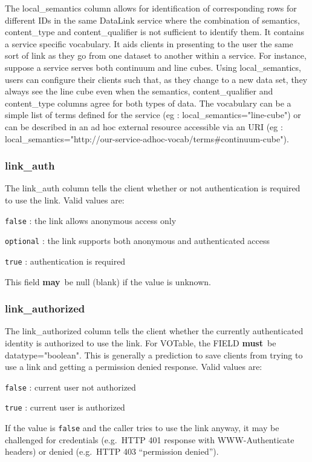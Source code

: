 \documentclass[11pt,a4paper]{ivoa}
\newcommand{\attval}[2]{#1={\allowbreak}{"}#2{"}}
\newcommand{\rfcmust}{\textbf{must}}
\newcommand{\rfcmay}{\textbf{may}}
\begin{document}
The local\_semantics column allows for identification of corresponding rows for
different IDs in the same DataLink service where the combination of semantics,
content\_type and content\_qualifier is not sufficient to identify them.
It contains a service specific vocabulary. It aids clients in presenting to the
user the same sort of link as they go from one dataset to another within a service.
For instance, suppose a service serves both continuum and line cubes. 
Using local\_semantics, users can configure their clients such that, as they change
to a new data set, they always see the line cube even when the semantics, 
content\_qualifier and content\_type columns agree for both types of data. 
The vocabulary can be a simple list of terms defined for the service
(eg : local\_semantics="line-cube") or can be described in an ad hoc external resource
accessible via an URI 
(eg : local\_semantics="http://our-service-adhoc-vocab/terms\#continuum-cube").


\subsubsection{link\_auth}
\label{sec:linkAuth}

The link\_auth column tells the client whether or not authentication is required
to use the link. Valid values are:

\verb|false| : the link allows anonymous access only

\verb|optional| : the link supports both anonymous and authenticated access

\verb|true| : authentication is required

This field \rfcmay\ be null (blank) if the value is unknown.

\subsubsection{link\_authorized}
\label{sec:linkAuthorized}

The link\_authorized column tells the client whether the currently authenticated
identity is authorized to use the link. For VOTable, the FIELD \rfcmust\ be
\attval{datatype}{boolean}. This is generally a prediction to save
clients from trying to use a link and getting a permission denied response. Valid
values are:

\verb|false| : current user not authorized

\verb|true| : current user is authorized

If the value is \verb|false| and the caller tries to use the link anyway, it may be
challenged for credentials (e.g.\ HTTP 401 response with WWW-Authenticate headers) or
denied (e.g.\ HTTP 403 ``permission denied'').
\end{document}
